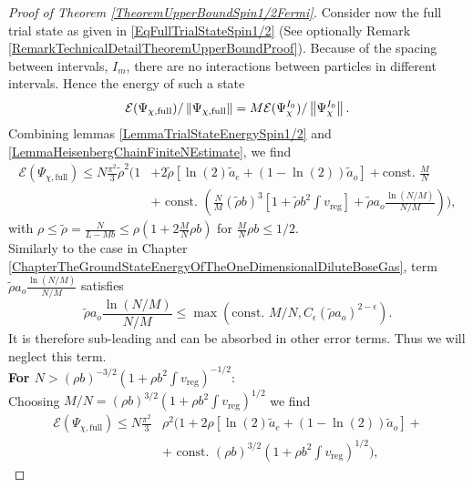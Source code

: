 \begin{proof}[Proof of Theorem \ref{TheoremUpperBoundSpin1/2Fermi}]
	Consider now the full trial state as given in \eqref{EqFullTrialStateSpin1/2} (See optionally Remark \ref{RemarkTechnicalDetailTheoremUpperBoundProof}). Because of the spacing between intervals, $ I_m $, there are no interactions between particles in different intervals. Hence the energy of such a state \begin{equation}
	\mathcal{E}(\Psi_{\chi,\text{full}})/\left\lVert \Psi_{\chi,\text{full}} \right\rVert=M\mathcal{E}(\Psi_{\chi}^{I_0})/\left\lVert \Psi^{I_0}_{\chi} \right\rVert.
	\end{equation}
	Combining lemmas \ref{LemmaTrialStateEnergySpin1/2} and \ref{LemmaHeisenbergChainFiniteNEstimate}, we find \begin{equation}
	\begin{aligned}
	\mathcal{E}(\Psi_{\chi,\text{full}})\leq N\frac{\pi^2}{3}\tilde{\rho}^2\Bigg(1&+2\tilde{\rho}\left[\ln(2)\tilde{a}_e+(1-\ln(2))\tilde{a}_o\right]+\text{const. }\frac{M}{N}\\&+\text{ const. }\left(\frac{N}{M}(\tilde{\rho} b)^3 \left[1+\tilde{\rho} b^2\int v_{\text{reg}}\right]+\tilde{\rho} a_o\frac{\ln(N/M)}{N/M}\right)\Bigg),
	\end{aligned}
	\end{equation}
	with $ \rho\leq \tilde{\rho}=\frac{N}{L-Mb}\leq\rho\left(1+2\frac{M}{N}\rho b\right) $ for $ \frac{M}{N}\rho b\leq 1/2 $.\\
	Similarly to the case in Chapter \ref{ChapterTheGroundStateEnergyOfTheOneDimensionalDiluteBoseGas}, term $\tilde{\rho} a_o\frac{\ln(N/M)}{N/M}$ satisfies 
	$$ \tilde{\rho} a_o\frac{\ln(N/M)}{N/M}\leq \max(\text{const. }M/N,C_\epsilon (\tilde{\rho}a_o)^{2-\epsilon}). $$ It is therefore sub-leading and can be absorbed in other error terms. Thus we will neglect this term.\\
	\textbf{For $ N>(\rho b)^{-3/2}\left(1+\rho b^2\int v_{\text{reg}}\right)^{-1/2} $}:\\
	 Choosing $ M/N=(\rho b)^{3/2}\left(1+\rho b^2\int v_{\text{reg}}\right)^{1/2} $ we find \begin{equation}\label{EqSpin1/2TrialStateEnergyBoundFull}
	\begin{aligned}
	\mathcal{E}(\Psi_{\chi,\text{full}})\leq N\frac{\pi^2}{3}&\rho^2\Bigg(1+2\rho\left[\ln(2)\tilde{a}_e+(1-\ln(2))\tilde{a}_o\right]+\\&+\text{ const. }(\rho b)^{3/2} \left(1+\rho b^2\int v_{\text{reg}}\right)^{1/2}\Bigg),
	\end{aligned}

\end{equation}
\end{proof}
